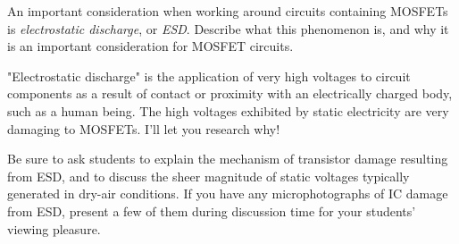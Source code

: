 

An important consideration when working around circuits containing MOSFETs is {\it electrostatic discharge}, or {\it ESD}.  Describe what this phenomenon is, and why it is an important consideration for MOSFET circuits.







"Electrostatic discharge" is the application of very high voltages to circuit components as a result of contact or proximity with an electrically charged body, such as a human being.  The high voltages exhibited by static electricity are very damaging to MOSFETs.  I'll let you research why!







Be sure to ask students to explain the mechanism of transistor damage resulting from ESD, and to discuss the sheer magnitude of static voltages typically generated in dry-air conditions.  If you have any microphotographs of IC damage from ESD, present a few of them during discussion time for your students' viewing pleasure.




